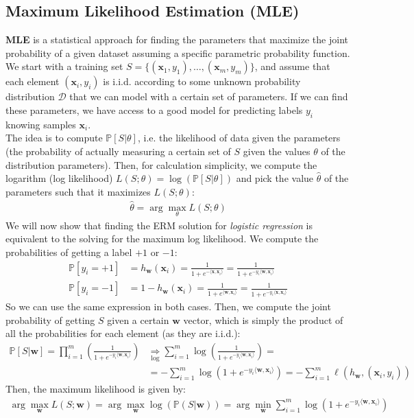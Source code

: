 \documentclass[../template.tex]{subfiles}
\begin{document}
\subsection{Maximum Likelihood Estimation (MLE)}
\textbf{MLE} is a statistical approach for finding the parameters that maximize the joint probability of a given dataset assuming a specific parametric probability function.\\
We start with a training set $S = \{(\bm{x}_1, y_1), \dots, (\bm{x}_m, y_m)\}$, and assume that each element $(\bm{x}_i, y_i)$ is i.i.d. according to some unknown probability distribution $\mathcal{D}$  that we can model with a certain set of parameters. If we can find these parameters, we have access to a good model for predicting labels $y_i$ knowing samples $\bm{x}_i$.\\
The idea is to compute $\mathbb{P}[S|\theta]$, i.e. the likelihood of data given the parameters (the probability of actually measuring a certain set of $S$ given the values $\theta$ of the distribution parameters). Then, for calculation simplicity, we compute the logarithm (log likelihood) $L(S;\theta) = \log(\mathbb{P}[S|\theta])$ and pick the value $\hat{\theta}$ of the parameters such that it maximizes $L(S;\theta)$:
\begin{align*}
    \hat{\theta} = \arg \max_{\theta} L(S;\theta)
\end{align*} 
We will now show that finding the ERM solution for \textit{logistic regression} is equivalent to the solving for the maximum log likelihood. We compute the probabilities of getting a label $+1$ or $-1$:
\begin{align*}
    \mathbb{P}[y_i = +1] &= h_{\bm{w}}(\bm{x}_i) = \frac{1}{1 + e^{-\langle \bm{x}, \bm{x}_i \rangle}} = \frac{1}{1 + e^{-y_i \langle \bm{w}, \bm{x}_i \rangle}}\\
    \mathbb{P}[y_i = -1] &= 1 - h_{\bm{w}}(\bm{x}_i) = \frac{1}{1+ e^{\langle \bm{w}, \bm{x}_i \rangle}} = \frac{1}{1 + e^{-y_i \langle \bm{x}, \bm{x}_i \rangle}}  
\end{align*}  
So we can use the same expression in both cases. Then, we compute the joint probability of getting $S$ given a certain $\bm{w}$ vector, which is simply the product of all the probabilities for each element (as they are i.i.d.):
\begin{align*}
    \mathbb{P}[S|\bm{w}] = \prod_{i=1}^m \left(\frac{1}{1 + e^{-y_i \langle \bm{w}, \bm{x}_i \rangle}} \right) &\underset{\log}{\Rightarrow}  \sum_{i=1}^m \log \left(\frac{1}{1 + e^{-y_i \langle \bm{w}, \bm{x}_i \rangle}} \right) =\\
    &= - \sum_{i=1}^m \log ( 1 + e^{-y_i \langle \bm{w}, \bm{x}_i \rangle}) = - \sum_{i=1}^m \ell  (h_{\bm{w}}, (\bm{x}_i, y_i))
\end{align*}  
Then, the maximum likelihood is given by:
\begin{align*}
    \arg \max_{\bm{w}} L(S; \bm{w}) = \arg\max_{\bm{w}} \log(\mathbb{P}(S|\bm{w})) = \arg\min_{\bm{w}} \sum_{i=1}^m \log(1+ e^{-y_i \langle \bm{w}, \bm{x}_i \rangle})
\end{align*}
\end{document}
